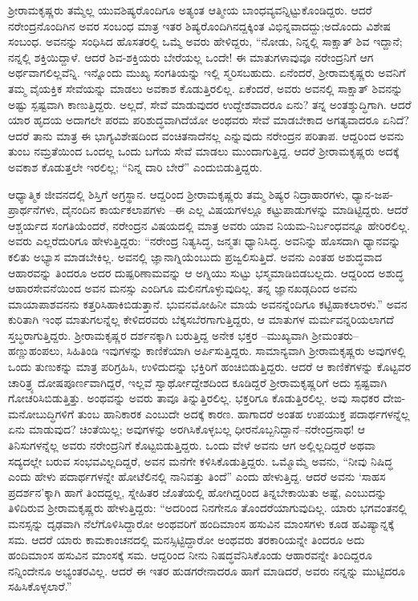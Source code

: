 ಶ್ರೀರಾಮಕೃಷ್ಣರು ತಮ್ಮೆಲ್ಲ ಯುವಶಿಷ್ಯರೊಂದಿಗೂ ಅತ್ಯಂತ ಆತ್ಮೀಯ ಬಾಂಧವ್ಯವನ್ನಿಟ್ಟುಕೊಂಡಿದ್ದರು. ಆದರೆ ನರೇಂದ್ರನೊಂದಿಗಿನ ಅವರ ಸಂಬಂಧ ಮಾತ್ರ ಇತರ ಶಿಷ್ಯರೊಂದಿಗಿನದ್ದಕ್ಕಿಂತ ವಿಭಿನ್ನವಾದದ್ದು;ಅದೊಂದು ವಿಶೇಷ ಸಂಬಂಧ. ಅವನನ್ನು ಸಂಧಿಸಿದ ಹೊಸತರಲ್ಲಿ ಒಮ್ಮೆ ಅವರು ಹೇಳಿದ್ದರು, “ನೋಡು, ನಿನ್ನಲ್ಲಿ ಸಾಕ್ಷಾತ್ ಶಿವ ಇದ್ದಾನೆ; ನನ್ನಲ್ಲಿ ಶಕ್ತಿಯಿದ್ದಾಳೆ. ಆದರೆ ಶಿವ-ಶಕ್ತಿಯರು ಬೇರೆಯಲ್ಲ ಒಂದೇ! ಈ ಮಾತುಗಳಾವುವೂ ನರೇಂದ್ರನಿಗೆ ಆಗ ಅರ್ಥವಾಗಲಿಲ್ಲವೆನ್ನಿ. ಇನ್ನೊಂದು ಮುಖ್ಯ ಸಂಗತಿಯನ್ನು ಇಲ್ಲಿ ಸ್ಮರಿಸಬಹುದು. ಏನೆಂದರೆ, ಶ್ರೀರಾಮಕೃಷ್ಣರು ಅವನಿಗೆ ತಮ್ಮ ವೈಯಕ್ತಿಕ ಸೇವೆಯನ್ನು ಮಾಡಲು ಅವಕಾಶ ಕೊಡುತ್ತಿರಲಿಲ್ಲ. ಏಕೆಂದರೆ, ಅವರು ಅವನಲ್ಲಿ ಸಾಕ್ಷಾತ್ ಶಿವನನ್ನು ಅಷ್ಟು ಸ್ಪಷ್ಟವಾಗಿ ಕಾಣುತ್ತಿದ್ದರು. ಅಲ್ಲದೆ, ಸೇವೆ ಮಾಡುವುದರ ಉದ್ದೇಶವಾದರೂ ಏನು? ತನ್ನ ಅಂತಶ್ಶುದ್ಧಿಗಾಗಿ. ಆದರೆ ಯಾರ ಹೃದಯ ಅದಾಗಲೇ ಪರಮ ಪರಿಶುದ್ಧವಾಗಿದೆಯೋ ಅಂಥವರು ಸೇವೆ ಮಾಡಬೇಕಾದ ಅಗತ್ಯವಾದರೂ ಏನಿದೆ? ಆದರೆ ತಾನು ಮಾತ್ರ ಈ ಭಾಗ್ಯವಿಶೇಷದಿಂದ ವಂಚಿತನಾದೆನಲ್ಲ ಎನ್ನುವುದು ನರೇಂದ್ರನ ಪರಿತಾಪ. ಆದ್ದರಿಂದ ಅವನು ತುಂಬ ನಮ್ರತೆಯಿಂದ ಒಂದಲ್ಲ ಒಂದು ಬಗೆಯ ಸೇವೆ ಮಾಡಲು ಮುಂದಾಗುತ್ತಿದ್ದ. ಆದರೆ ಶ್ರೀರಾಮಕೃಷ್ಣರು ಅದಕ್ಕೆ ಅವಕಾಶ ಕೊಡುತ್ತಲೇ ಇರಲಿಲ್ಲ; “ನಿನ್ನ ದಾರಿ ಬೇರೆ” ಎಂದುಬಿಡುತ್ತಿದ್ದರು.

ಆಧ್ಯಾತ್ಮಿಕ ಜೀವನದಲ್ಲಿ ಶಿಸ್ತಿಗೆ ಅಗ್ರಸ್ಥಾನ. ಆದ್ದರಿಂದ ಶ್ರೀರಾಮಕೃಷ್ಣರು ತಮ್ಮ ಶಿಷ್ಯರ ನಿದ್ರಾಹಾರಗಳು, ಧ್ಯಾನ-ಜಪ-ಪ್ರಾರ್ಥನೆಗಳು, ದೈನಂದಿನ ಕಾರ್ಯಕಲಾಪಗಳು –ಈ ಎಲ್ಲ ವಿಷಯಗಳಲ್ಲೂ ಕಟ್ಟುಪಾಡುಗಳನ್ನು ಮಾಡಿಟ್ಟಿದ್ದರು. ಆದರೆ ಆಶ್ಚರ್ಯದ ಸಂಗತಿಯೆಂದರೆ, ನರೇಂದ್ರನ ವಿಷಯದಲ್ಲಿ ಮಾತ್ರ ಅವರು ಯಾವ ನಿಯಮ-ನಿರ್ಬಂಧವನ್ನೂ ಹೇರಿರಲಿಲ್ಲ. ಅವರು ಎಲ್ಲರೆದುರಿಗೂ ಹೇಳುತ್ತಿದ್ದರು: “ನರೇಂದ್ರ ನಿತ್ಯಸಿದ್ಧ, ಜನ್ಮತಃ ಧ್ಯಾನಿಸಿದ್ಧ. ಅವನಿನ್ನು ಹೊಸದಾಗಿ ಧ್ಯಾನವನ್ನು ಕಲಿತು ಅಭ್ಯಾಸ ಮಾಡಬೇಕಿಲ್ಲ. ಅವನಲ್ಲಿ ಜ್ಞಾನಾಗ್ನಿಯೆಂಬುದು ಪ್ರಜ್ವಲಿಸುತ್ತಿದೆ. ಅವನು ಎಂತಹ ಅಶುದ್ಧವಾದ ಆಹಾರವನ್ನು ತಿಂದರೂ ಅದರ ದುಷ್ಪರಿಣಾಮವನ್ನು ಆ ಅಗ್ನಿಯು ಸುಟ್ಟು ಭಸ್ಮಮಾಡಿಬಿಡಬಲ್ಲದು. ಆದ್ದರಿಂದ ಅಶುದ್ಧ ಆಹಾರಸೇವನೆಯಿಂದ ಅವನ ಮನಸ್ಸು ಎಂದಿಗೂ ಮಲಿನಗೊಳ್ಳುವುದಿಲ್ಲ. ತನ್ನ ಜ್ಞಾನಖಡ್ಗದಿಂದ ಅವನು ಮಾಯಾಪಾಶವನನು ಕತ್ತರಿಸಿಹಾಕಿಬಿಡುತ್ತಾನೆ. ಭುವನಮೋಹಿನೀ ಮಾಯೆ ಅವನನ್ನೆಂದಿಗೂ ಕಟ್ಟಿಹಾಕಲಾರಳು.” ಅವನ ಕುರಿತಾಗಿ ಇಂಥ ಮಾತುಗಲನ್ನೆಲ್ಲ ಕೇಳಿದರವರು ಬೆಕ್ಕಸಬೆರಗಾಗುತ್ತಿದ್ದರು, ಆ ಮಾತುಗಳ ಮರ್ಮವನ್ನರಿಯಲಾಗದೆ ಸ್ತಬ್ಧರಾಗುತ್ತಿದ್ದರು. ಶ್ರೀರಾಮಕೃಷ್ಣರ ದರ್ಶನಕ್ಕಾಗಿ ಬರುತ್ತಿದ್ದ ಅನೇಕ ಭಕ್ತರ –ಮುಖ್ಯವಾಗಿ ಶ್ರೀಮಂತರು–ಹಣ್ಣುಹಂಪಲು, ಸಿಹಿತಿಂಡಿ ಇವುಗಳನ್ನು ಕಾಣಿಕೆಯಾಗಿ ಅರ್ಪಿಸುತ್ತಿದ್ದರು. ಸಾಮಾನ್ಯವಾಗಿ ಶ್ರೀರಾಮಕೃಷ್ಣರು ಅವುಗಳಲ್ಲಿ ಒಂದು ತುಣುಕನ್ನು ಮಾತ್ರ ಪರಿಗ್ರಹಿಸಿ, ಉಳಿದುದನ್ನು ಭಕ್ತಿರಿಗೆ ಹಂಚಿಬಿಡುತ್ತಿದ್ದರು. ಆದರೆ ಆ ಕಾಣಿಕೆಗಳನ್ನು ಕೊಟ್ಟವರ ಚಾರಿತ್ರ್ಯ ದೋಷಪೂರ್ಣವಾಗಿದ್ದರೆ, ಇಲ್ಲವೆ ಸ್ವಾರ್ಥೋದ್ದೇಶದಿಂದ ಕೂಡಿದ್ದರೆ ಶ್ರೀರಾಮಕೃಷ್ಣರಿಗೆ ಅದು ಸ್ಪಷ್ಟವಾಗಿ ಗೋಚರಿಸಿಬಿಡುತ್ತಿತ್ತು. ಅಂಥವನ್ನು ಅವರು ತಾವೂ ತಿನ್ನುತ್ತಿರಲಿಲ್ಲ. ಭಕ್ತರಿಗೂ ಕೊಡುತ್ತಿರಲಿಲ್ಲ. ಅವು ಸಾಧಕರ ದೇಙ-ಮನೋಬುದ್ಧಿಗಳಿಗೆ ತುಂಬ ಹಾನಿಕಾರಕ ಎಂಬುದೇ ಅದಕ್ಕೆ ಕಾರಣ. ಹಾಗಾದರೆ ಅಂತಹ ಉಪಯುಕ್ತ ಪದಾರ್ಥಗಳನ್ನೆಲ್ಲ ಏನು ಮಾಡುವುದ? ಚಿಂತೆಯಿಲ್ಲ; ಅವುಗಳನ್ನು ಅರಗಿಸಿಕೊಳ್ಳಬಲ್ಲ ಧೀರನೊಬ್ಬನಿದ್ದಾನೆ–ನರೇಂದ್ರನಾಥ! ಆ ತಿನಿಸುಗಳನ್ನೆಲ್ಲ ಅವರು ನರೇಂದ್ರನಿಗೆ ಕೊಟ್ಟಬಿಡುತ್ತಿದ್ದರು. ಒಂದು ವೇಳೆ ಅವನು ಆಗ ಅಲ್ಲಿಲ್ಲದಿದ್ದರೆ ಅಥವಾ ಸದ್ಯದಲ್ಲೇ ಬರುವ ಸಂಭವವಿಲ್ಲದಿದ್ದರೆ, ಅವನ ಮನೆಗೇ ಕಳಿಸಿಕೊಡುತ್ತಿದ್ದರು. ಒಮ್ಮೊಮ್ಮೆ ಅವನು, “ನೀವು ನಿಷಿದ್ಧ ಎಂದು ಹೇಳು ಪದಾರ್ಥಗಳನ್ನೇ ಹೋಟೆಲಿನಲ್ಲಿ ನಾನಿವತ್ತು ತಿಂದೆ” ಎಂದು ಹೇಳುತ್ತಿದ್ದ. ಆದರೆ ಅವನು ‘ಸಾಹಸ ಪ್ರದರ್ಶನ’ಕ್ಕಾಗಿ ಹಾಗೆ ತಿಂದದ್ದಲ್ಲ, ಸ್ನೇಹಿತರ ಜೊತೆಯಲ್ಲಿ ಹೋಗಿದ್ದರಿಂದ ತಿನ್ನಬೇಕಾಯಿತು ಅಷ್ಟೆ, ಎಂಬುದನ್ನು ತಿಳಿದಿರುವ ಶ್ರೀರಾಮಕೃಷ್ಣರು ಹೇಳುತ್ತಿದ್ದರು: “ಅದರಿಂದ ನಿನಗೇನೂ ತೊಂದರೆಯಾಗುವುದಿಲ್ಲ. ಯಾರು ಭಗವಂತನಲ್ಲಿ ಮನಸ್ಸನ್ನು ದೃಢವಾಗಿ ನೆಲೆಗೊಳಿಸಿದ್ದಾರೋ ಅಂಥವರಿಗೆ ಹಂದಿಮಾಂಸ ಹಸುವಿನ ಮಾಂಸಗಳು ಕೂಡ ಹವಿಷ್ಯಾನ್ನಕ್ಕೆ ಸಮ. ಆದರೆ ಯಾರು ಕಾಮಕಾಂಚನದಲ್ಲಿ ಮನಸ್ಸಿಟ್ಟಿದ್ದಾರೋ ಅಂಥವರು ತರಕಾರಿಯನ್ನೇ ತಿಂದರೂ ಅದು ಹಂದಿಮಾಂಸ ಹಸುವಿನ ಮಾಂಸಕ್ಕೆ ಸಮ. ಆದ್ದರಿಂದ ನೀನು ನಿಷದ್ಧವೆನಿಸಿಕೊಂಡು ಆಹಾರವನ್ನೇ ತಿಂದಿದ್ದರೂ ನನ್ನಿಂದೇನೂ ಅಭ್ಯಂತರವಿಲ್ಲ. ಆದರೆ ಈ ಇತರ ಹುಡಗರೇನಾದರೂ ಹಾಗೆ ಮಾಡಿದರೆ, ಅವರು ನನ್ನನ್ನು ಮುಟ್ಟಿದರೂ ಸಹಿಸಿಕೊಳ್ಳಲಾರೆ.”

